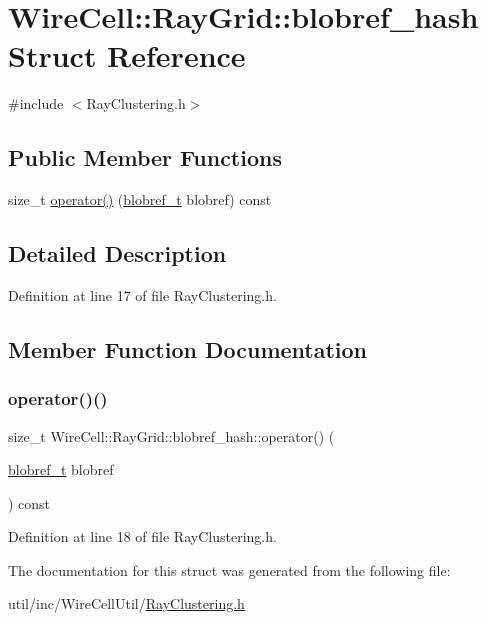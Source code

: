 \hypertarget{struct_wire_cell_1_1_ray_grid_1_1blobref__hash}{}\section{Wire\+Cell\+:\+:Ray\+Grid\+:\+:blobref\+\_\+hash Struct Reference}
\label{struct_wire_cell_1_1_ray_grid_1_1blobref__hash}


{\ttfamily \#include $<$Ray\+Clustering.\+h$>$}

\subsection*{Public Member Functions}
\begin{DoxyCompactItemize}
\item 
size\+\_\+t \hyperlink{struct_wire_cell_1_1_ray_grid_1_1blobref__hash_a5744ce5c5682291414f9939dd46d64ea}{operator()} (\hyperlink{namespace_wire_cell_1_1_ray_grid_abed76699c704f53d6c4ce912da18050b}{blobref\+\_\+t} blobref) const
\end{DoxyCompactItemize}


\subsection{Detailed Description}


Definition at line 17 of file Ray\+Clustering.\+h.



\subsection{Member Function Documentation}
\mbox{\label{struct_wire_cell_1_1_ray_grid_1_1blobref__hash_a5744ce5c5682291414f9939dd46d64ea}} 
\subsubsection{\texorpdfstring{operator()()}{operator()()}}
{\footnotesize\ttfamily size\+\_\+t Wire\+Cell\+::\+Ray\+Grid\+::blobref\+\_\+hash\+::operator() (\begin{DoxyParamCaption}\item[{\hyperlink{namespace_wire_cell_1_1_ray_grid_abed76699c704f53d6c4ce912da18050b}{blobref\+\_\+t}}]{blobref }\end{DoxyParamCaption}) const\hspace{0.3cm}{\ttfamily [inline]}}



Definition at line 18 of file Ray\+Clustering.\+h.



The documentation for this struct was generated from the following file\+:\begin{DoxyCompactItemize}
\item 
util/inc/\+Wire\+Cell\+Util/\hyperlink{_ray_clustering_8h}{Ray\+Clustering.\+h}\end{DoxyCompactItemize}
